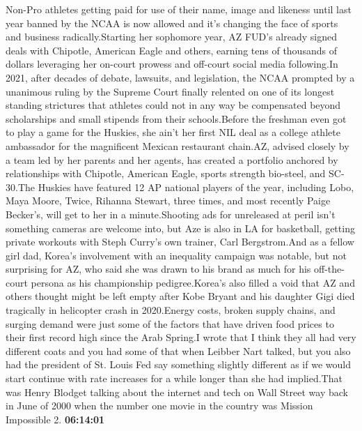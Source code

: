 \documentclass{article}%
\begin{document}
Non{-}Pro athletes getting paid for use of their name, image and likeness until last year banned by the NCAA is now allowed and it's changing the face of sports and business radically.Starting her sophomore year, AZ FUD's already signed deals with Chipotle, American Eagle and others, earning tens of thousands of dollars leveraging her on{-}court prowess and off{-}court social media following.In 2021, after decades of debate, lawsuits, and legislation, the NCAA prompted by a unanimous ruling by the Supreme Court finally relented on one of its longest standing strictures that athletes could not in any way be compensated beyond scholarships and small stipends from their schools.Before the freshman even got to play a game for the Huskies, she ain't her first NIL deal as a college athlete ambassador for the magnificent Mexican restaurant chain.AZ, advised closely by a team led by her parents and her agents, has created a portfolio anchored by relationships with Chipotle, American Eagle, sports strength bio{-}steel, and SC{-}30.The Huskies have featured 12 AP national players of the year, including Lobo, Maya Moore, Twice, Rihanna Stewart, three times, and most recently Paige Becker's, will get to her in a minute.Shooting ads for unreleased at peril isn't something cameras are welcome into, but Aze is also in LA for basketball, getting private workouts with Steph Curry's own trainer, Carl Bergstrom.And as a fellow girl dad, Korea's involvement with an inequality campaign was notable, but not surprising for AZ, who said she was drawn to his brand as much for his off{-}the{-}court persona as his championship pedigree.Korea's also filled a void that AZ and others thought might be left empty after Kobe Bryant and his daughter Gigi died tragically in helicopter crash in 2020.Energy costs, broken supply chains, and surging demand were just some of the factors that have driven food prices to their first record high since the Arab Spring.I wrote that I think they all had very different coats and you had some of that when Leibber Nart talked, but you also had the president of St. Louis Fed say something slightly different as if we would start continue with rate increases for a while longer than she had implied.That was Henry Blodget talking about the internet and tech on Wall Street way back in June of 2000 when the number one movie in the country was Mission Impossible 2.%
\textbf{06:14:01}%
\newline%
\end{document}
